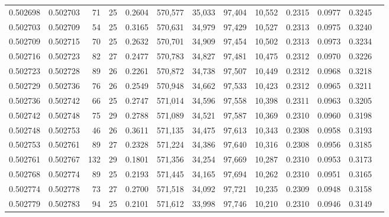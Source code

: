 \begin{tabular}{rrrrrrrrrrrrr}
0.502698 & 0.502703 &  71 &  25 &                                     0.2604 & 570,577 &  35,033 &  97,404 &  10,552 & 0.2315 & 0.0977 & 0.3245 \\
0.502703 & 0.502709 &  54 &  25 &                                     0.3165 & 570,631 &  34,979 &  97,429 &  10,527 & 0.2313 & 0.0975 & 0.3240 \\
0.502709 & 0.502715 &  70 &  25 &                                     0.2632 & 570,701 &  34,909 &  97,454 &  10,502 & 0.2313 & 0.0973 & 0.3234 \\
0.502716 & 0.502723 &  82 &  27 &                                     0.2477 & 570,783 &  34,827 &  97,481 &  10,475 & 0.2312 & 0.0970 & 0.3226 \\
0.502723 & 0.502728 &  89 &  26 &                                     0.2261 & 570,872 &  34,738 &  97,507 &  10,449 & 0.2312 & 0.0968 & 0.3218 \\
0.502729 & 0.502736 &  76 &  26 &                                     0.2549 & 570,948 &  34,662 &  97,533 &  10,423 & 0.2312 & 0.0965 & 0.3211 \\
0.502736 & 0.502742 &  66 &  25 &                                     0.2747 & 571,014 &  34,596 &  97,558 &  10,398 & 0.2311 & 0.0963 & 0.3205 \\
0.502742 & 0.502748 &  75 &  29 &                                     0.2788 & 571,089 &  34,521 &  97,587 &  10,369 & 0.2310 & 0.0960 & 0.3198 \\
0.502748 & 0.502753 &  46 &  26 &                                     0.3611 & 571,135 &  34,475 &  97,613 &  10,343 & 0.2308 & 0.0958 & 0.3193 \\
0.502753 & 0.502761 &  89 &  27 &                                     0.2328 & 571,224 &  34,386 &  97,640 &  10,316 & 0.2308 & 0.0956 & 0.3185 \\
0.502761 & 0.502767 & 132 &  29 &                                     0.1801 & 571,356 &  34,254 &  97,669 &  10,287 & 0.2310 & 0.0953 & 0.3173 \\
0.502768 & 0.502774 &  89 &  25 &                                     0.2193 & 571,445 &  34,165 &  97,694 &  10,262 & 0.2310 & 0.0951 & 0.3165 \\
0.502774 & 0.502778 &  73 &  27 &                                     0.2700 & 571,518 &  34,092 &  97,721 &  10,235 & 0.2309 & 0.0948 & 0.3158 \\
0.502779 & 0.502783 &  94 &  25 &                                     0.2101 & 571,612 &  33,998 &  97,746 &  10,210 & 0.2310 & 0.0946 & 0.3149 \\

\end{tabular}
